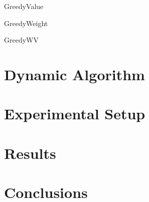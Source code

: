 \documentclass[10pt, letterpaper]{article}
\begin{document}
\begin{algorithm}
  \begin{algorithmic}
    \caption{GreedyValue}\label{GreedyValue}

    \EndFunction
  \end{algorithmic}
\end{algorithm}

\begin{algorithm}
  \begin{algorithmic}
    \caption{GreedyWeight}\label{GreedyWeight}
    
    \EndFunction
  \end{algorithmic}
\end{algorithm}

\begin{algorithm}
  \begin{algorithmic}
    \caption{GreedyWV}\label{GreedyWV}

    \EndFunction
  \end{algorithmic}
\end{algorithm}

\section{Dynamic Algorithm}


\section{Experimental Setup}


\section{Results}


\section{Conclusions}
\end{document}
